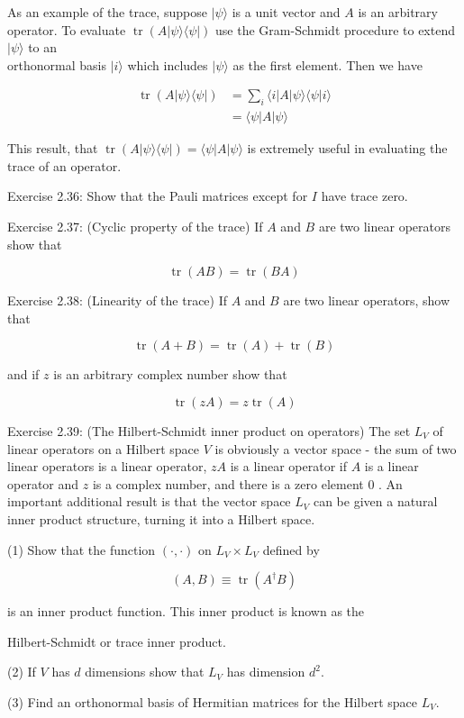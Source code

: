 As an example of the trace, suppose $|\psi\rangle$ is a unit vector and $A$ is an arbitrary operator. To evaluate $\operatorname{tr}(A|\psi\rangle\langle\psi|)$ use the Gram-Schmidt procedure to extend $|\psi\rangle$ to an\\
orthonormal basis $|i\rangle$ which includes $|\psi\rangle$ as the first element. Then we have

$$
\begin{aligned}
\operatorname{tr}(A|\psi\rangle\langle\psi|) & =\sum_{i}\langle i|A| \psi\rangle\langle\psi | i\rangle \\
& =\langle\psi|A| \psi\rangle
\end{aligned}
$$

This result, that $\operatorname{tr}(A|\psi\rangle\langle\psi|)=\langle\psi|A| \psi\rangle$ is extremely useful in evaluating the trace of an operator.

Exercise 2.36: Show that the Pauli matrices except for $I$ have trace zero.

Exercise 2.37: (Cyclic property of the trace) If $A$ and $B$ are two linear operators show that

$$
\operatorname{tr}(A B)=\operatorname{tr}(B A)
$$

Exercise 2.38: (Linearity of the trace) If $A$ and $B$ are two linear operators, show that

$$
\operatorname{tr}(A+B)=\operatorname{tr}(A)+\operatorname{tr}(B)
$$

and if $z$ is an arbitrary complex number show that

$$
\operatorname{tr}(z A)=z \operatorname{tr}(A)
$$

Exercise 2.39: (The Hilbert-Schmidt inner product on operators) The set $L_{V}$ of linear operators on a Hilbert space $V$ is obviously a vector space - the sum of two linear operators is a linear operator, $z A$ is a linear operator if $A$ is a linear operator and $z$ is a complex number, and there is a zero element 0 . An important additional result is that the vector space $L_{V}$ can be given a natural inner product structure, turning it into a Hilbert space.

(1) Show that the function $(\cdot, \cdot)$ on $L_{V} \times L_{V}$ defined by

$$
(A, B) \equiv \operatorname{tr}\left(A^{\dagger} B\right)
$$

is an inner product function. This inner product is known as the

Hilbert-Schmidt or trace inner product.

(2) If $V$ has $d$ dimensions show that $L_{V}$ has dimension $d^{2}$.

(3) Find an orthonormal basis of Hermitian matrices for the Hilbert space $L_{V}$.